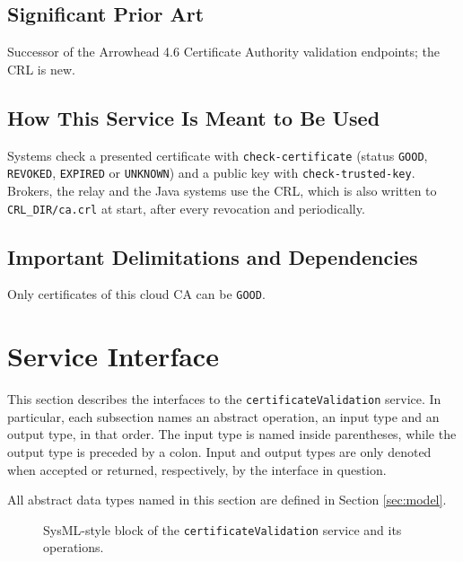 \documentclass[a4paper]{arrowhead}
\begin{document}
\subsection{Significant Prior Art}

Successor of the Arrowhead 4.6 Certificate Authority validation endpoints; the CRL is new.

\subsection{How This Service Is Meant to Be Used}

Systems check a presented certificate with \texttt{check-\allowbreak{}certificate} (status \texttt{GOOD}, \texttt{REVOKED}, \texttt{EXPIRED} or \texttt{UNKNOWN}) and a public key with \texttt{check-\allowbreak{}trusted-\allowbreak{}key}. Brokers, the relay and the Java systems use the CRL, which is also written to \texttt{CRL\_\allowbreak{}DIR/\allowbreak{}ca.\allowbreak{}crl} at start, after every revocation and periodically.

\subsection{Important Delimitations and Dependencies}
\label{sec:delimitations}

Only certificates of this cloud CA can be \texttt{GOOD}.

\newpage

\section{Service Interface}
\label{sec:operations}

This section describes the interfaces to the \texttt{certificate\allowbreak{}Validation} service.
In particular, each subsection names an abstract operation, an input type and an output type, in that order.
The input type is named inside parentheses, while the output type is preceded by a colon.
Input and output types are only denoted when accepted or returned, respectively, by the interface in question.

All abstract data types named in this section are defined in Section \ref{sec:model}.

\begin{figure}[ht!]
  \centering
  \caption{SysML-style block of the \texttt{certificate\allowbreak{}Validation} service and its operations.}
  \label{fig:SD}
\end{figure}
\end{document}
